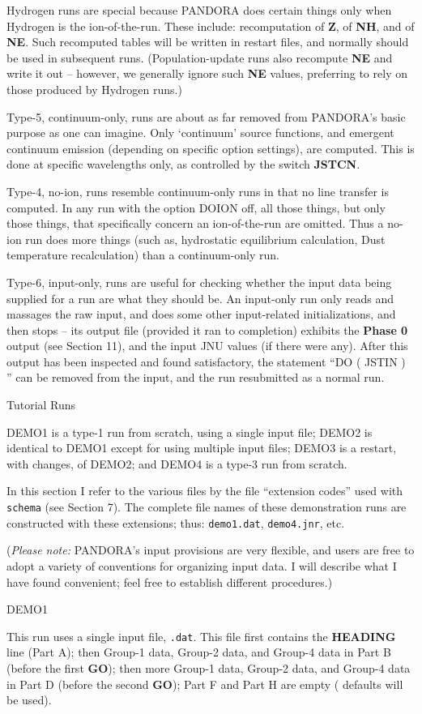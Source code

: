 Hydrogen runs are special because PANDORA does certain things only when
Hydrogen is the ion-of-the-run. These include: recomputation of {\bf Z},
of {\bf NH}, and of {\bf NE}. Such recomputed tables will be written in
restart files, and normally \break should be used in subsequent runs.
(Population-update runs also recompute {\bf NE} and write it out --
however, we generally ignore such {\bf NE} values, preferring to rely
on those produced by Hydrogen runs.)

Type-5, continuum-only, runs are about as far removed from PANDORA's
basic purpose as one can imagine. Only `continuum' source functions,
and emergent continuum emission (depending on specific option settings),
are computed. This is done at specific wavelengths only, as controlled
by the switch {\bf JSTCN}.

Type-4, no-ion, runs resemble continuum-only runs in that no line
transfer is computed. In any run with the option DOION off, all
those things, but only those things, that specifically concern an
ion-of-the-run are omitted. Thus a no-ion run does more things (such as,
hydrostatic equilibrium calculation, Dust temperature recalculation)
than a continuum-only run.

Type-6, input-only, runs are useful for checking whether the input data being 
supplied for a run are what they should be. An input-only run only reads and 
massages the raw input, and does some other input-related initializations,
and then stops -- {\ie} its output file (provided it ran to completion)
exhibits the {\bf Phase 0} output (see Section 11), and the input JNU
values (if there were any). After this output has been inspected and found
satisfactory, the statement \break ``DO ( JSTIN ) '' can be removed from the
input, and the run resubmitted as a normal run. 
\blankline
\blankline
\centerline{Tutorial Runs}
\blankline
DEMO1 is a type-1 run from scratch, using a single input file;
DEMO2 is identical to DEMO1 except for using multiple input files; DEMO3 is
a restart, with changes, of DEMO2; and DEMO4 is a type-3 run from scratch.

In this section I refer to the various files by the file ``extension
codes'' used with {\tt schema} (see Section 7). The complete file names
of these demonstration runs are constructed with these extensions; thus:
{\tt demo1.dat}, {\tt demo4.jnr}, etc.

({\it Please note:} PANDORA's input provisions are very flexible,
and users are free to adopt a variety of conventions for organizing
input data. I will describe what I have found convenient;
feel free to establish different procedures.)
\blankline
\blankline
\centerline{DEMO1}
\blankline
This run uses a single input file, {\tt .dat}. This file first contains the
{\bf HEADING} line (Part A); then Group-1 data, Group-2 data, and
Group-4 data in Part B (before the first {\bf GO}); then more
Group-1 data, Group-2 data, and Group-4 data in Part D (before the
second {\bf GO}); Part F and Part H are empty ({\ie} defaults 
will be used).

